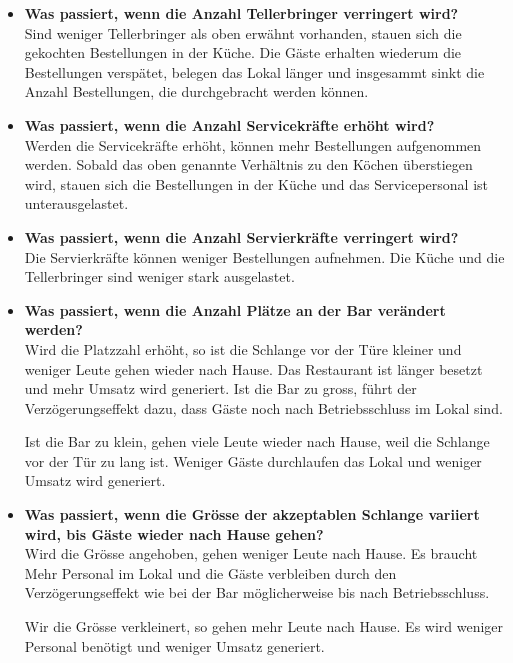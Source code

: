 \documentclass[ngerman,a4paper,12pt]{scrreprt}
\begin{document}
\begin{itemize}
			\item \textbf{Was passiert, wenn die Anzahl Tellerbringer verringert wird?}\\
				Sind weniger Tellerbringer als oben erwähnt vorhanden, stauen sich die gekochten Bestellungen in der Küche. Die Gäste erhalten wiederum die Bestellungen verspätet, belegen das Lokal länger und insgesammt sinkt die Anzahl Bestellungen, die durchgebracht werden können.
			\item \textbf{Was passiert, wenn die Anzahl Servicekräfte erhöht wird?}\\
				Werden die Servicekräfte erhöht, können mehr Bestellungen aufgenommen werden. Sobald das oben genannte Verhältnis zu den Köchen überstiegen wird, stauen sich die Bestellungen in der Küche und das Servicepersonal ist unterausgelastet.
			\item \textbf{Was passiert, wenn die Anzahl Servierkräfte verringert wird?}\\
				Die Servierkräfte können weniger Bestellungen aufnehmen. Die Küche und die Tellerbringer sind weniger stark ausgelastet.
			\item \textbf{Was passiert, wenn die Anzahl Plätze an der Bar verändert werden?}\\
				Wird die Platzzahl erhöht, so ist die Schlange vor der Türe kleiner und weniger Leute gehen wieder nach Hause. Das Restaurant ist länger besetzt und mehr Umsatz wird generiert. Ist die Bar zu gross, führt der Verzögerungseffekt dazu, dass Gäste noch nach Betriebsschluss im Lokal sind.
				
				Ist die Bar zu klein, gehen viele Leute wieder nach Hause, weil die Schlange vor der Tür zu lang ist. Weniger Gäste durchlaufen das Lokal und weniger Umsatz wird generiert.
			\item \textbf{Was passiert, wenn die Grösse der akzeptablen Schlange variiert wird, bis Gäste wieder nach Hause gehen?}\\
				Wird die Grösse angehoben, gehen weniger Leute nach Hause. Es braucht Mehr Personal im Lokal und die Gäste verbleiben durch den Verzögerungseffekt wie bei der Bar möglicherweise bis nach Betriebsschluss.
				
				Wir die Grösse verkleinert, so gehen mehr Leute nach Hause. Es wird weniger Personal benötigt und weniger Umsatz generiert.
		\end{itemize}
\end{document}
